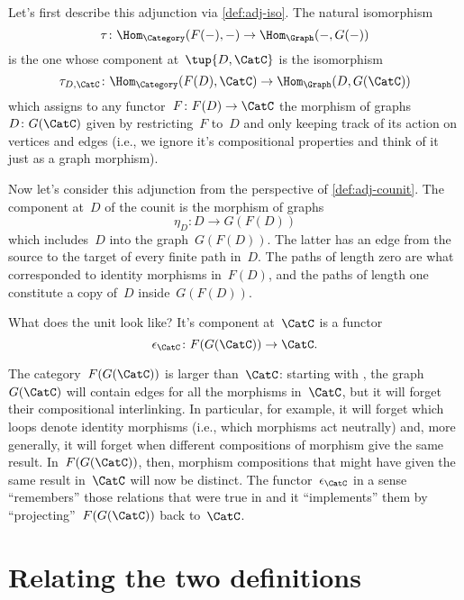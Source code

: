 Let's first describe this adjunction via \cref{def:adj-iso}. The natural isomorphism
\begin{equation*}
  \tau\colon \Hom_{\Category}(F(- ), - ) \to \Hom_{\Graph}(- , G( - ))
\end{equation*}
is the one whose component at~$\tup{D,\CatC}$ is the isomorphism
\begin{equation*}
  \tau_{D,\CatC} \colon \Hom_{\Category}(F(D), \CatC) \to \Hom_{\Graph}(D, G(\CatC))
\end{equation*}
which assigns to any functor~$F\colon F(D) \to \CatC$ the morphism of graphs~$D \colon G(\CatC)$ given by restricting~$F$ to~$D$ and only keeping track of its action on vertices and edges (i.e., we ignore it's compositional properties and think of it just as a graph morphism).

Now let's consider this adjunction from the perspective of \cref{def:adj-counit}. The component at~$D$ of the counit is the morphism of graphs
\begin{equation*}
  \eta_D \colon D \to  G(F(D))
\end{equation*}
which includes~$D$ into the graph~$G(F(D))$. The latter has an edge from the source to the target of every finite path in~$D$. The paths of length zero are what corresponded to identity morphisms in~$F(D)$, and the paths of length one constitute a copy of~$D$ inside~$G(F(D))$.

What does the unit look like? It's component at~$\CatC$ is a functor
\begin{equation*}
  \epsilon_{\CatC} \colon F(G(\CatC)) \to \CatC.
\end{equation*}

The category~$F(G(\CatC))$ is larger than~$\CatC$: starting with \CatC, the graph~$G(\CatC)$ will contain edges for all the morphisms in~$\CatC$, but it will forget their compositional interlinking. In particular, for example, it will forget which loops denote identity morphisms (i.e., which morphisms act neutrally) and, more generally, it will forget when different compositions of morphism give the same result. In~$F(G(\CatC))$, then, morphism compositions that might have given the same result in~$\CatC$ will now be distinct.
The functor~$\epsilon_{\CatC}$ in a sense ``remembers'' those relations that were true in \CatC and it ``implements'' them by ``projecting''~$F(G(\CatC))$ back to~$\CatC$.


\section{Relating the two definitions}
\label{relate-adj-defs}

